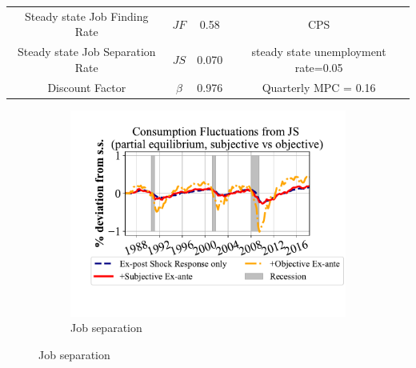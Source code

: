 \begin{center}
\begin{table}
{\begin{tabular}{|c|ccl|c|}
Steady state Job Finding Rate & \multicolumn{1}{c}{$JF$} & 0.58 & \multicolumn{2}{c|}{CPS} \\ 
Steady state Job Separation Rate& \multicolumn{1}{c}{$JS$} & 0.070 & \multicolumn{2}{c|}{steady state unemployment rate=0.05} \\  \hline
Discount Factor & \multicolumn{1}{c}{$\beta$} &  0.976 & \multicolumn{2}{c|}{Quarterly MPC = 0.16} \\  \hline
\end{tabular}}
\end{table}
\end{center}






\begin{figure}[ht]
    \centering
    \caption{\textbf{Quarterly} Consumption Fluctuations due to Unemployment Risks}
    \label{fig:pe_decompose_sub_obj_monthly}

    \begin{subfigure}{0.32\linewidth}
         \caption*{Job separation}
        \includegraphics[width=\linewidth]{text/chapter2/Figures/consumption_pe_JS_deviation_machine_as_rational.pdf}
   

\end{subfigure}
\end{figure}
